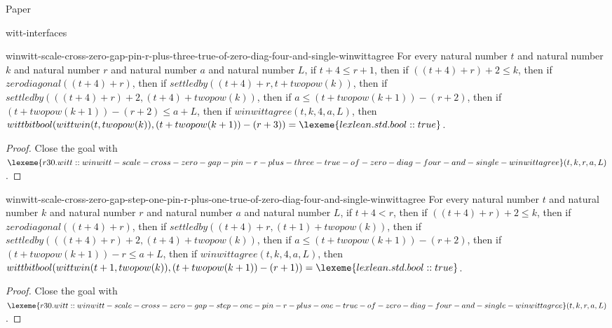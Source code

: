 \begin{lexlean}{Paper}
\begin{section}{witt-interfaces}
  \begin{theorem}{winwitt-scale-cross-zero-gap-pin-r-plus-three-true-of-zero-diag-four-and-single-winwittagree}
  For every natural number \(t\) and natural number \(k\) and natural number \(r\) and natural number \(a\) and natural number \(L\), if \(t + 4 ≤ r + 1\), then if \(((t + 4) + r) + 2 ≤ k\), then if \(zerodiagonal((t + 4) + r)\), then if \(settledby((t + 4) + r, t + twopow(k))\), then if \(settledby(((t + 4) + r) + 2, (t + 4) + twopow(k))\), then if \(a ≤ (t + twopow(k + 1)) - (r + 2)\), then if \((t + twopow(k + 1)) - (r + 2) ≤ a + L\), then if \(winwittagree(t, k, 4, a, L)\), then \(wittbitbool(wittwin(t, twopow(k)), (t + twopow(k + 1)) - (r + 3)) = \lexeme{lexlean.std.bool::true}\).
  \begin{proof}
  Close the goal with \(\lexeme{r30.witt::winwitt-scale-cross-zero-gap-pin-r-plus-three-true-of-zero-diag-four-and-single-winwittagree}(t, k, r, a, L)\).
  \end{proof}
  \end{theorem}

  \begin{theorem}{winwitt-scale-cross-zero-gap-step-one-pin-r-plus-one-true-of-zero-diag-four-and-single-winwittagree}
  For every natural number \(t\) and natural number \(k\) and natural number \(r\) and natural number \(a\) and natural number \(L\), if \(t + 4 < r\), then if \(((t + 4) + r) + 2 ≤ k\), then if \(zerodiagonal((t + 4) + r)\), then if \(settledby((t + 4) + r, (t + 1) + twopow(k))\), then if \(settledby(((t + 4) + r) + 2, (t + 4) + twopow(k))\), then if \(a ≤ (t + twopow(k + 1)) - (r + 2)\), then if \((t + twopow(k + 1)) - r ≤ a + L\), then if \(winwittagree(t, k, 4, a, L)\), then \(wittbitbool(wittwin(t + 1, twopow(k)), (t + twopow(k + 1)) - (r + 1)) = \lexeme{lexlean.std.bool::true}\).
  \begin{proof}
  Close the goal with \(\lexeme{r30.witt::winwitt-scale-cross-zero-gap-step-one-pin-r-plus-one-true-of-zero-diag-four-and-single-winwittagree}(t, k, r, a, L)\).
  \end{proof}
  \end{theorem}


\end{section}
\end{lexlean}
